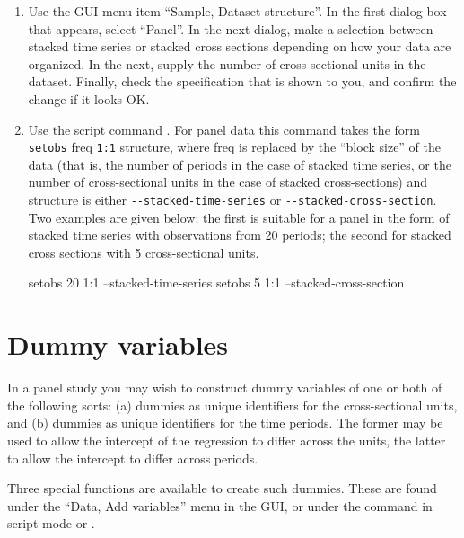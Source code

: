 \begin{enumerate}
\item Use the GUI menu item ``Sample, Dataset structure''.  In the
  first dialog box that appears, select ``Panel''.  In the next
  dialog, make a selection between stacked time series or stacked
  cross sections depending on how your data are organized.  In the
  next, supply the number of cross-sectional units in the dataset.
  Finally, check the specification that is shown to you, and confirm
  the change if it looks OK.
\item Use the script command .  For panel data this
  command takes the form \verb+setobs+ freq \verb+1:1+ structure,
  where freq is replaced by the ``block size'' of the data (that is,
  the number of periods in the case of stacked time series, or the
  number of cross-sectional units in the case of stacked
  cross-sections) and structure is either \verb+--stacked-time-series+
  or \verb+--stacked-cross-section+.  Two examples are given below:
  the first is suitable for a panel in the form of stacked time series
  with observations from 20 periods; the second for stacked cross
  sections with 5 cross-sectional units.
\begin{code}
            setobs 20 1:1 --stacked-time-series
            setobs 5 1:1 --stacked-cross-section
\end{code}
\end{enumerate}

\section{Dummy variables}
\label{dummies}

In a panel study you may wish to construct dummy variables of one or
both of the following sorts: (a) dummies as unique identifiers for the
cross-sectional units, and (b) dummies as unique identifiers for the
time periods.  The former may be used to allow the intercept of the
regression to differ across the units, the latter to allow the
intercept to differ across periods.

Three special functions are available to create such dummies.  These
are found under the ``Data, Add variables'' menu in the GUI, or under
the  command in script mode or .


